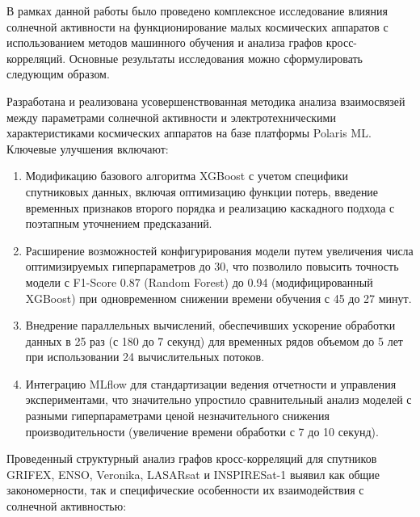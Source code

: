 В рамках данной работы было проведено комплексное исследование влияния солнечной
активности на функционирование малых космических аппаратов с использованием
методов машинного обучения и анализа графов кросс-корреляций. Основные
результаты исследования можно сформулировать следующим образом.

Разработана и реализована усовершенствованная методика анализа взаимосвязей
между параметрами солнечной активности и электротехническими характеристиками
космических аппаратов на базе платформы Polaris ML. Ключевые улучшения включают:

\begin{enumerate}[wide]
	\item Модификацию базового алгоритма XGBoost с учетом специфики спутниковых данных, включая оптимизацию функции потерь, введение временных признаков второго порядка и реализацию каскадного подхода с поэтапным уточнением предсказаний.

	\item Расширение возможностей конфигурирования модели путем увеличения числа оптимизируемых гиперпараметров до 30, что позволило повысить точность модели с F1-Score 0.87 (Random Forest) до 0.94 (модифицированный XGBoost) при одновременном снижении времени обучения с 45 до 27 минут.

	\item Внедрение параллельных вычислений, обеспечивших ускорение обработки данных в 25 раз (с 180 до 7 секунд) для временных рядов объемом до 5 лет при использовании 24 вычислительных потоков.

	\item Интеграцию MLflow для стандартизации ведения отчетности и управления экспериментами, что значительно упростило сравнительный анализ моделей с разными гиперпараметрами ценой незначительного снижения производительности (увеличение времени обработки с 7 до 10 секунд).
\end{enumerate}

Проведенный структурный анализ графов кросс-корреляций для спутников GRIFEX,
ENSO, Veronika, LASARsat и INSPIRESat-1 выявил как общие закономерности, так и
специфические особенности их взаимодействия с солнечной активностью:


